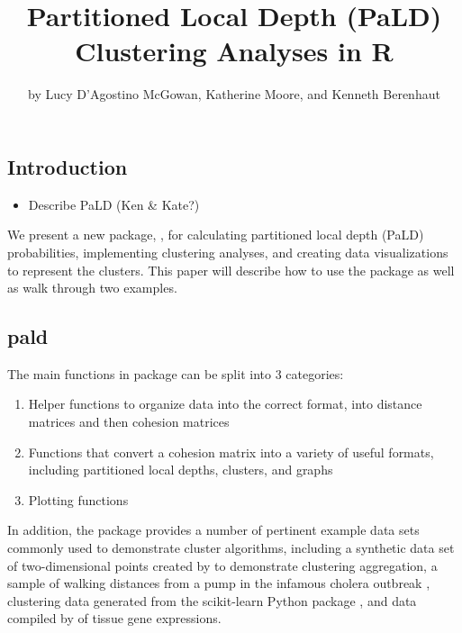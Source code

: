 \title{Partitioned Local Depth (PaLD) Clustering Analyses in R}
\author{by Lucy D'Agostino McGowan, Katherine Moore, and Kenneth Berenhaut}

\maketitle


\hypertarget{introduction}{%
\subsection{Introduction}\label{introduction}}

\begin{itemize}
\tightlist
\item
  Describe PaLD (Ken \& Kate?) \citep{berenhaut2022social}
\end{itemize}

We present a new package, , for calculating partitioned
local depth (PaLD) probabilities, implementing clustering analyses, and
creating data visualizations to represent the clusters. This paper will
describe how to use the package as well as walk through two examples.

\hypertarget{pald}{%
\subsection{pald}\label{pald}}

The main functions in  package can be split into 3
categories:

\begin{enumerate}
\def\labelenumi{\arabic{enumi}.}
\tightlist
\item
  Helper functions to organize data into the correct format, into
  distance matrices and then cohesion matrices
\item
  Functions that convert a cohesion matrix into a variety of useful
  formats, including partitioned local depths, clusters, and graphs
\item
  Plotting functions
\end{enumerate}

In addition, the package provides a number of pertinent example data
sets commonly used to demonstrate cluster algorithms, including a
synthetic data set of two-dimensional points created by
\citet{gionis1clustering} to demonstrate clustering aggregation, a
sample of walking distances from a pump in the infamous cholera outbreak
\citep{cholera}, clustering data generated from the scikit-learn Python
package \citep{pedregosa2011scikit}, and data compiled by \cite{tissue}
of tissue gene expressions.

